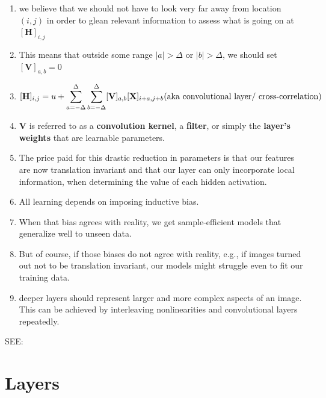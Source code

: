 \begin{enumerate}[itemsep=0.2cm]
    \item we believe that we should not have to look very far away from location $(i,j)$ in order to glean relevant information to assess what is going on at $[\mathbf{H}]_{i, j}$

    \item This means that outside some range $|a|> \Delta$ or $|b|> \Delta$, we should set $[\mathbf{V}]_{a, b} = 0$

    \item[] 
    $
        [\mathbf{H}]_{i, j} = u + \dsum_{a = -\Delta}^{\Delta} \dsum_{b = -\Delta}^{\Delta} [\mathbf{V}]_{a, b}  [\mathbf{X}]_{i+a, j+b}
        \hfill
        \text{(aka convolutional layer/ cross-correlation)}
    $

    \item $\mathbf{V}$ is referred to as a \textbf{convolution kernel}, a \textbf{filter}, or simply the \textbf{layer’s weights} that are learnable parameters.

    \item The price paid for this drastic reduction in parameters is that our features are now translation invariant and that our layer can only incorporate local information, when determining the value of each hidden activation. 
    
    \item All learning depends on imposing inductive bias. 
    
    \item When that bias agrees with reality, we get sample-efficient models that generalize well to unseen data. 
    
    \item But of course, if those biases do not agree with reality, e.g., if images turned out not to be translation invariant, our models might struggle even to fit our training data.

    \item deeper layers should represent larger and more complex aspects of an image. This can be achieved by interleaving nonlinearities and convolutional layers repeatedly.
\end{enumerate}

SEE: 






\section{Layers}
